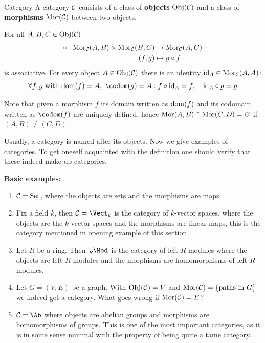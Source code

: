 \documentclass[twoside = false,	%
		headsepline,		%
		parskip = true,
		]{scrbook}						%
\begin{document}
    \begin{definition*}{Category}
        A category $\mathcal C$ consists of a class of \textbf{objects} $\mathrm{Obj}(\mathcal C)$ and
        a class of \textbf{morphisms} $\mathrm{Mor}(\mathcal C)$ between two objects.
        
        For all $A,B,C \in \mathrm{Obj}(\mathcal C)$
        \begin{equation*}
            \begin{split}
               \circ: \mathrm{Mor}_{\mathcal C}(A,B) \times \mathrm{Mor}_{\mathcal C}(B,C) &\rightarrow \mathrm{Mor}_{\mathcal C}(A,C) \\
                (f,g) &\mapsto g \circ f
            \end{split}
        \end{equation*}
        is associative. For every object $A \in \mathrm{Obj}(\mathcal C)$ there is an identity $\mathrm{id}_A \in \mathrm{Mor}_{\mathcal C}(A,A)$:
        \begin{equation*}
           \forall f,g \text{ with } \dom(f) = A, \ \codom(g) = A:  f \circ \id_A = f, \quad \id_A \circ g = g
        \end{equation*}
    \end{definition*}

    Note that given a morphism $f$ its domain written as $\mathrm{dom}(f)$ and
    its codomain written as $\codom(f)$ are uniquely defined,
    hence $\mathrm{Mor}(A,B) \cap \mathrm{Mor}(C,D) = \varnothing$ if $(A,B) \neq (C,D)$.

    Usually, a category is named after its objects. Now we give examples of categories.
    To get oneself acquainted with the definition one should verify that these indeed make up categories.
    
    \textbf{Basic examples:}
        \begin{enumerate}
            \item
                $\mathcal C = \mathrm{Set}$, where the objects are sets and the morphisms are maps.
            \item
                Fix a field $k$, then $\cC = \Vect_k$ is the category of $k$-vector spaces, where the objects are the $k$-vector spaces and the morphisms are linear maps, this is the category mentioned in opening example of this section.
            \item
                Let $R$ be a ring. Then $\tensor[_R]{\Mod}{^{}}$ is the category of left $R$-modules where the objects are left $R$-modules and the morphisms are homomorphisms of left $R$-modules.
            \item
                Let $G = (V,E)$ be a graph. With $\mathrm{Obj}(\mathcal C) = V$ and $\mathrm{Mor} (\mathcal C) = \{\text{paths in } G\}$ we indeed get a category. What goes wrong if $\mathrm{Mor}(\mathcal C) = E$?
            \item
                $\cC = \Ab$ where objects are abelian groups and morphisms are homomorphisms of groups. This is one of the most important categories, as it is in some sense minimal with the property of being quite a tame category.
        \end{enumerate}
\end{document}
